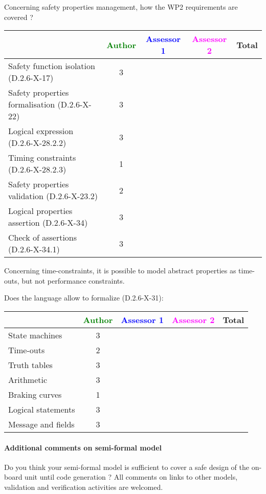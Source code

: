 Concerning safety properties management, how the WP2 requirements are covered ?

\begin{tabular}{|l | c | c | c | c|}
\hline
& \textcolor{green}{Author} & \textcolor{blue}{Assessor 1} & \textcolor{magenta}{Assessor 2} & Total \\
\hline 
Safety function isolation (D.2.6-X-17)  & 3 & & &  \\
\hline 
Safety properties formalisation (D.2.6-X-22)  & 3 & & &  \\
\hline
Logical expression (D.2.6-X-28.2.2)  & 3 & & &  \\
\hline
Timing constraints (D.2.6-X-28.2.3)  & 1 & & &  \\
\hline
Safety properties validation (D.2.6-X-23.2)  & 2 & & &  \\
\hline
Logical properties assertion (D.2.6-X-34)  & 3 & & &  \\
\hline
Check  of assertions (D.2.6-X-34.1)  & 3 & & &  \\
\hline
\end{tabular}


\begin{author_comment}
Concerning time-constraints, it is possible to  model  abstract properties as time-outs, but not performance constraints.
\end{author_comment}


Does the language allow to  formalize (D.2.6-X-31):

\begin{tabular}{|l | c | c | c | c|}
\hline
& \textcolor{green}{Author} & \textcolor{blue}{Assessor 1} & \textcolor{magenta}{Assessor 2} & Total \\
\hline 
State machines  & 3 & & &  \\
\hline
Time-outs  & 2 & & &  \\
\hline
Truth tables  & 3 & & &  \\
\hline
Arithmetic  & 3 & & &  \\
\hline
Braking curves  & 1 & & &  \\
\hline
Logical statements & 3 & & &  \\
\hline
Message and fields & 3 & & &  \\
\hline
\end{tabular}

\paragraph{Additional comments on semi-formal  model} Do you think your semi-formal  model is sufficient to cover a safe design of the on-board unit until code generation ?
All comments on links to  other models, validation and verification activities are welcomed.



